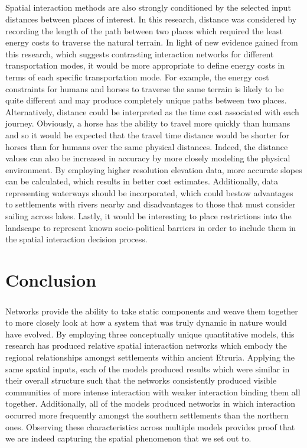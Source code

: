 \documentclass[12pt,a4paper]{thesis}
\begin{document}
\paragraph{}
Spatial interaction methods are also strongly conditioned by the selected input distances between places of interest. In this research, distance was considered by recording the length of the path between two places which required the least energy costs to traverse the natural terrain. In light of new evidence gained from this research, which suggests contrasting interaction networks for different transportation modes, it would be more appropriate to define energy costs in terms of each specific transportation mode. For example, the energy cost constraints for humans and horses to traverse the same terrain is likely to be quite different and may produce completely unique paths between two places. Alternatively, distance could be interpreted as the time cost associated with each journey. Obviously, a horse has the ability to travel more quickly than humans and so it would be expected that the travel time distance would be shorter for horses than for humans over the same physical distances. Indeed, the distance values can also be increased in accuracy by more closely modeling the physical environment. By employing higher resolution elevation data, more accurate slopes can be calculated, which results in better cost estimates. Additionally, data representing waterways should be incorporated, which could bestow advantages to settlements with rivers nearby and disadvantages to those that must consider sailing across lakes. Lastly, it would be interesting to place restrictions into the landscape to represent known socio-political barriers in order to include them in the spatial interaction decision process.  



\chapter{Conclusion}

\paragraph{}
Networks provide the ability to take static components and weave them together to more closely look at how a system that was truly dynamic in nature would have evolved. By employing three conceptually unique quantitative models, this research has produced relative spatial interaction networks which embody the regional relationships amongst settlements within ancient Etruria. Applying the same spatial inputs, each of the models produced results which were similar in their overall structure such that the networks consistently produced visible communities of more intense interaction with weaker interaction binding them all together. Additionally, all of the models produced networks in which interaction occurred more frequently amongst the southern settlements than the northern ones. Observing these characteristics across multiple models provides proof that we are indeed capturing the spatial phenomenon that we set out to.     
\end{document}
